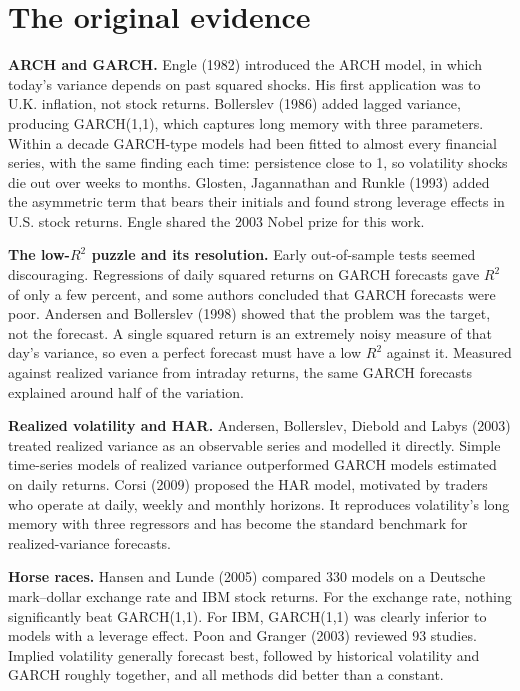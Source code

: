 \section{The original evidence}
\label{sec:11-evidence}

\textbf{ARCH and GARCH.} Engle (1982) introduced the ARCH model, in which today's variance depends on past squared shocks. His first application was to U.K. inflation, not stock returns. Bollerslev (1986) added lagged variance, producing GARCH(1,1), which captures long memory with three parameters. Within a decade GARCH-type models had been fitted to almost every financial series, with the same finding each time: persistence close to 1, so volatility shocks die out over weeks to months. Glosten, Jagannathan and Runkle (1993) added the asymmetric term that bears their initials and found strong leverage effects in U.S. stock returns. Engle shared the 2003 Nobel prize for this work.

\textbf{The low-$R^2$ puzzle and its resolution.} Early out-of-sample tests seemed discouraging. Regressions of daily squared returns on GARCH forecasts gave $R^2$ of only a few percent, and some authors concluded that GARCH forecasts were poor. Andersen and Bollerslev (1998) showed that the problem was the target, not the forecast. A single squared return is an extremely noisy measure of that day's variance, so even a perfect forecast must have a low $R^2$ against it. Measured against realized variance from intraday returns, the same GARCH forecasts explained around half of the variation.

\textbf{Realized volatility and HAR.} Andersen, Bollerslev, Diebold and Labys (2003) treated realized variance as an observable series and modelled it directly. Simple time-series models of realized variance outperformed GARCH models estimated on daily returns. Corsi (2009) proposed the HAR model, motivated by traders who operate at daily, weekly and monthly horizons. It reproduces volatility's long memory with three regressors and has become the standard benchmark for realized-variance forecasts.

\textbf{Horse races.} Hansen and Lunde (2005) compared 330 models on a Deutsche mark--dollar exchange rate and IBM stock returns. For the exchange rate, nothing significantly beat GARCH(1,1). For IBM, GARCH(1,1) was clearly inferior to models with a leverage effect. Poon and Granger (2003) reviewed 93 studies. Implied volatility generally forecast best, followed by historical volatility and GARCH roughly together, and all methods did better than a constant.

